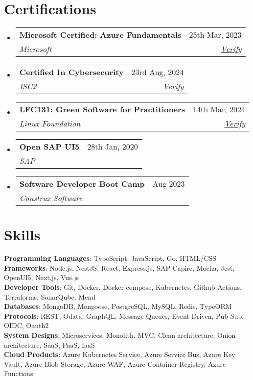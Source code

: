 \documentclass[letterpaper,11pt]{article}
\makeatletter
\newcommand{\resumeSubheading}[4]{
  \vspace{-2pt}\item
    \begin{tabular*}{0.97\textwidth}[t]{l@{\extracolsep{\fill}}r}
      \textbf{#1} & #2 \\
      \textit{\small#3} & \textit{\small #4} \\
    \end{tabular*}\vspace{-7pt}
}
\newcommand{\resumeSubHeadingListStart}{\begin{itemize}[leftmargin=0.15in, label={}]}
\newcommand{\resumeSubHeadingListEnd}{\end{itemize}}
\makeatother
\begin{document}
\section{Certifications}
  \resumeSubHeadingListStart
    \resumeSubheading
      {Microsoft Certified: Azure Fundamentals}{25th Mar, 2023}
      {Microsoft}{\href{https://www.credly.com/badges/aa9c3ec7-8e5d-4e0f-bd37-19fb382603f8/linked_in_profile}{\underline{Verify}}}

     \resumeSubheading
      {Certified In Cybersecurity}{23rd Aug, 2024}
      {ISC2}{\href{https://www.credly.com/badges/ffbfd08f-225c-435c-aac2-856c6e5c82b7/public_url}{\underline{Verify}}}

    \resumeSubheading
      {LFC131: Green Software for Practitioners}{14th Mar, 2024}
      {Linux Foundation}{\href{https://www.credly.com/badges/92e3361f-275d-44db-9bfd-1c926ea53289/public_url}{\underline{Verify}}}

    \resumeSubheading
      {Open SAP UI5}{28th Jan, 2020}
      {SAP}{}

    \resumeSubheading
      {Software Developer Boot Camp}{Aug 2023}
      {Construx Software}{}
  \resumeSubHeadingListEnd

  
\section{Skills}
 \begin{itemize}[leftmargin=0.15in, label={}]
    \small{\item{
     \textbf{Programming Languages}{: TypeScript, JavaScript, Go, HTML/CSS} \\
     \textbf{Frameworks}{: Node.js, NestJS, React, Express.js, SAP Capire, Mocha, Jest, OpenUI5, Next.js, Vue.js } \\
     \textbf{Developer Tools}{: Git, Docker, Docker-compose, Kubernetes, Github Actions, Terraforms, SonarQube, Mend} \\
     \textbf{Databases}{: MongoDB, Mongoose, PostgreSQL, MySQL, Redis, TypeORM} \\
     \textbf{Protocols}{: REST, Odata, GraphQL, Message Queues, Event-Driven, Pub-Sub, OIDC, Oauth2} \\
     \textbf{System Designs}{: Microservices, Monolith, MVC, Clean architecture, Onion architecture, SaaS, PaaS, IaaS} \\
     \textbf{Cloud Products}{: Azure Kubernetes Service, Azure Service Bus, Azure Key Vault, Azure Blob Storage, Azure WAF, Azure Container Registry, Azure Functions }
    }}
 \end{itemize}


\end{document}
